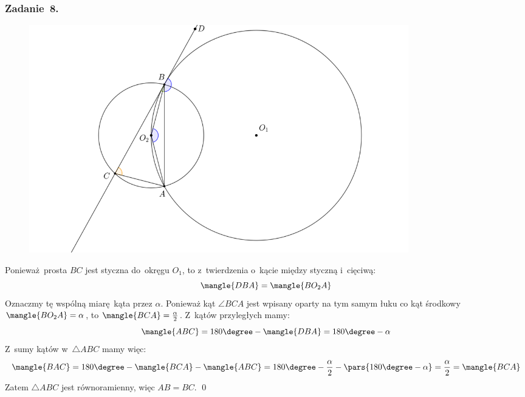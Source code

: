 \subsubsection*{Zadanie~8.}
\begin{figure}[H]
    \centering
    \includegraphics[width=0.8\textwidth]{img/2020_12_16/8.png}
\end{figure}
Ponieważ prosta \(BC\) jest styczna do~okręgu \(O_1\), to z~twierdzenia o~kącie między styczną i~cięciwą:
\begin{equation*}
    \mangle{DBA} = \mangle{BO_2A}
\end{equation*}
Oznaczmy tę wspólną miarę kąta przez \(\alpha\). Ponieważ kąt \(\angle{BCA}\) jest wpisany oparty na tym samym łuku co kąt środkowy \(\mangle{BO_2A} = \alpha\), to \(\mangle{BCA} = \frac{\alpha}{2}\). Z~kątów przyległych mamy:
\begin{equation*}
    \mangle{ABC} = 180\degree - \mangle{DBA} = 180\degree - \alpha
\end{equation*}
Z~sumy kątów w~\(\triangle{ABC}\) mamy więc:
\begin{equation*}
    \mangle{BAC} = 180\degree - \mangle{BCA} - \mangle{ABC}
        = 180\degree - \frac{\alpha}{2} - \pars{180\degree - \alpha}
        = \frac{\alpha}{2}
        = \mangle{BCA}
\end{equation*}
Zatem \(\triangle{ABC}\) jest równoramienny, więc \(AB = BC\).
\qed

